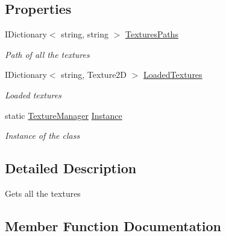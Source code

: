 \subsection*{Properties}
\begin{DoxyCompactItemize}
\item 
I\+Dictionary$<$ string, string $>$ \hyperlink{class_hel_project_1_1_u_i_1_1_texture_manager_a0524c77f2c5fd5c6f3eb57645bf8a521}{Textures\+Paths}
\begin{DoxyCompactList}\small\item\em Path of all the textures \end{DoxyCompactList}\item 
I\+Dictionary$<$ string, Texture2\+D $>$ \hyperlink{class_hel_project_1_1_u_i_1_1_texture_manager_a57751418291b635f8c1f16f8ef9a1468}{Loaded\+Textures}
\begin{DoxyCompactList}\small\item\em Loaded textures \end{DoxyCompactList}\item 
static \hyperlink{class_hel_project_1_1_u_i_1_1_texture_manager}{Texture\+Manager} \hyperlink{class_hel_project_1_1_u_i_1_1_texture_manager_a583c9e38fd71caf9d6b1cf4a1543ca0a}{Instance}
\begin{DoxyCompactList}\small\item\em Instance of the class \end{DoxyCompactList}\end{DoxyCompactItemize}


\subsection{Detailed Description}
Gets all the textures 



\subsection{Member Function Documentation}
\hypertarget{class_hel_project_1_1_u_i_1_1_texture_manager_ada156bc3a5f02b869a558d3ed2fd73c2}{}
